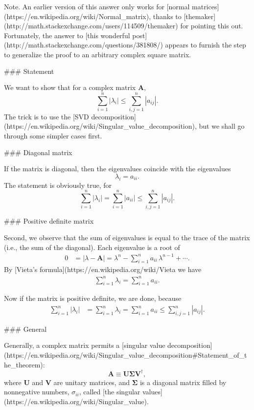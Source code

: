 Note. An earlier version of this answer only works for [normal matrices](https://en.wikipedia.org/wiki/Normal_matrix), thanks to [themaker](http://math.stackexchange.com/users/114509/themaker) for pointing this out.
Fortunately, the answer to [this wonderful post](http://math.stackexchange.com/questions/381808/) appears to furnish the step to generalize the proof to an arbitrary complex square matrix.




### Statement

We want to show that for a complex matrix $\mathbf A$,
$$
\sum_{i = 1}^n |\lambda_i| \le \sum_{i, j = 1}^n |a_{ij}|.
\tag{1}
$$
The trick is to use the [SVD decomposition](https://en.wikipedia.org/wiki/Singular_value_decomposition), but we shall go through some simpler cases first.

### Diagonal matrix

If the matrix is diagonal, then the eigenvalues coincide with the eigenvalues
$$
\lambda_i = a_{ii}.
$$
The statement is obviously true, for
$$
\sum_{i=1}^n |\lambda_{i}| =
\sum_{i=1}^n |a_{ii}| \le \sum_{i,j=1}^n |a_{ij}|.
$$

### Positive definite matrix

Second, we observe that the sum of eigenvalues
is equal to the trace of the matrix (i.e., the sum of the diagonal).
Each eigenvalue is a root of
\begin{align}
0
&=
|\lambda - \mathbf A|
=
\lambda^n - \sum_{i = 1}^n a_{ii} \, \lambda^{n-1} + \cdots.
\end{align}
By [Vieta's formula](https://en.wikipedia.org/wiki/Vieta%
we have
\begin{align}
  \sum_{i=1}^n \lambda_i = \sum_{i = 1}^n a_{ii}.
\end{align}

Now if the matrix is positive definite, we are done, because
\begin{align}
  \sum_{i = 1}^n |\lambda_i|
&=
  \sum_{i = 1}^n \lambda_i
=
\sum_{i = 1}^n a_{ii}
\le
\sum_{i,j=1}^n |a_{ij}|.
\end{align}


### General


Generally, a complex matrix permits a [singular value decomposition](https://en.wikipedia.org/wiki/Singular_value_decomposition#Statement_of_the_theorem):
$$
\mathbf A \equiv \mathbf U \mathbf \Sigma \mathbf V^\dagger,
$$
where $\mathbf U$ and $\mathbf V$ are unitary matrices,
and $\mathbf \Sigma$ is a diagonal matrix
filled by nonnegative numbers, $\sigma_{ii}$, called [the singular values](https://en.wikipedia.org/wiki/Singular_value).


